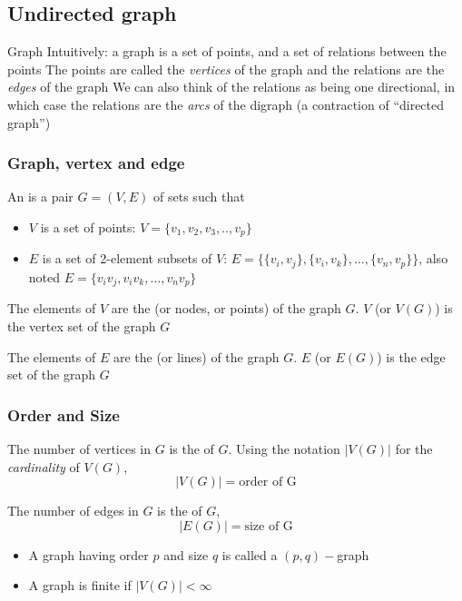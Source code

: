 \documentclass[aspectratio=43]{beamer}
\begin{document}
\subsection{Undirected graph}


\begin{frame}{Graph}
	Intuitively: a graph is a set of points, and a set of relations between the points
	\vfill
	The points are called the \emph{vertices} of the graph and the relations are the \emph{edges} of the graph
	\vfill
	We can also think of the relations as being one directional, in which case the relations are the \emph{arcs} of the digraph (a contraction of ``directed graph'')
\end{frame}


\begin{frame}\frametitle{Graph, vertex and edge} 
	\begin{definition}[Graph]
	An  is a pair $G=(V,E)$ of sets such that
	\begin{itemize}
	\item $V$ is a set of points:  $V=\{v_1,v_2,v_3,..,v_p\}$
	\item $E$ is a set of 2-element subsets of $V$: $E=\{\{v_i,v_j\},\{v_i,v_k\},\dots,\{v_n,v_p\}\}$, also noted $E=\{v_iv_j,v_iv_k,\dots,v_nv_p\}$
	\end{itemize}
	\end{definition}
	\begin{definition}[Vertex]
	The elements of $V$ are the  (or nodes, or points) of the graph $G$.
	$V$ (or $V(G)$) is the vertex set of the graph $G$
	\end{definition}
	\begin{definition}[Edge]
	The elements of $E$ are the  (or lines) of the graph $G$.
	$E$ (or $E(G)$) is the edge set of the graph $G$
	\end{definition}
\end{frame}

\begin{frame}\frametitle{Order and Size}
	\begin{definition}
	The number of vertices in $G$ is the  of $G$. Using the notation $|V(G)|$ for the \emph{cardinality} of $V(G)$,
	$$|V(G)|=\textrm{order of G}$$
	\end{definition}
	\vfill
	\begin{definition}
	The number of edges in $G$ is the  of $G$,
	$$|E(G)|=\textrm{size of G}$$
	\end{definition}
	\vfill
	\begin{itemize}
	\item A graph having order $p$ and size $q$ is called a $(p,q)-$graph
	\item A graph is finite if $|V(G)|<\infty$
	\end{itemize}
\end{frame}
\end{document}
